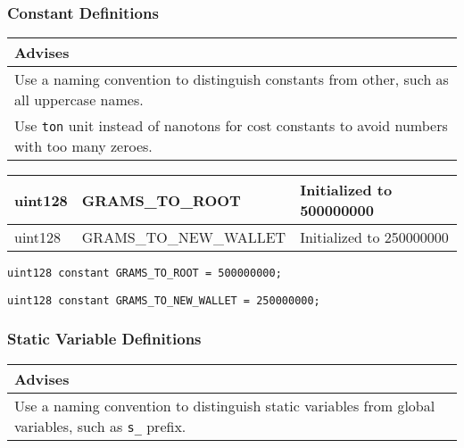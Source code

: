 \subsubsection{Constant Definitions}


\ifsoldraft
\noindent\begin{tabular}{|p{12cm}|}\hline
\rowcolor{green}Advises
\\\hline
Use a naming convention to distinguish constants from other, such as all uppercase names.
\\\hline
Use \verb+ton+ unit instead of nanotons for cost constants to avoid numbers with too many zeroes.
\\\hline\end{tabular}
\fi

\ifsoltables
\noindent\begin{tabular}{|l|l|p{5cm}|}\hline
uint128 & GRAMS\_{}TO\_{}ROOT & Initialized to 500000000  \\\hline
uint128 & GRAMS\_{}TO\_{}NEW\_{}WALLET & Initialized to 250000000  \\\hline
\end{tabular}
\fi


\begin{lstlisting}[firstnumber=19]
  uint128 constant GRAMS_TO_ROOT = 500000000;
\end{lstlisting}

\begin{lstlisting}[firstnumber=20]
  uint128 constant GRAMS_TO_NEW_WALLET = 250000000;
\end{lstlisting}

\subsubsection{Static Variable Definitions}


\ifsoldraft
\noindent\begin{tabular}{|p{12cm}|}\hline
\rowcolor{green}Advises
\\\hline
Use a naming convention to distinguish static variables from global variables, such as \verb+s_+ prefix.
\\\hline\end{tabular}
\fi

